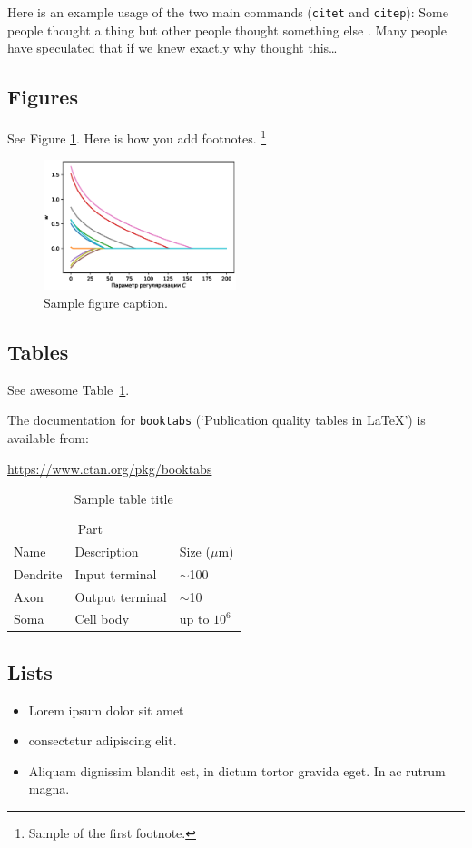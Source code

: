 \documentclass{article}
\begin{document}
Here is an example usage of the two main commands (\verb+citet+ and \verb+citep+): Some people thought a thing \citep{kour2014real, hadash2018estimate} but other people thought something else \citep{kour2014fast}. Many people have speculated that if we knew exactly why \citet{kour2014fast} thought this\dots

\subsection{Figures}
\lipsum[10]
See Figure \ref{fig:fig1}. Here is how you add footnotes. \footnote{Sample of the first footnote.}
\lipsum[11]

\begin{figure}
	\centering
	\includegraphics[width=0.5\textwidth]{../figures/log_reg_cs_exp.eps}
	\caption{Sample figure caption.}
	\label{fig:fig1}
\end{figure}

\subsection{Tables}
See awesome Table~\ref{tab:table}.

The documentation for \verb+booktabs+ (`Publication quality tables in LaTeX') is available from:
\begin{center}
	\url{https://www.ctan.org/pkg/booktabs}
\end{center}


\begin{table}
	\caption{Sample table title}
	\centering
	\begin{tabular}{lll}
		\toprule
		\multicolumn{2}{c}{Part}                   \\
		\cmidrule(r){1-2}
		Name     & Description     & Size ($\mu$m) \\
		\midrule
		Dendrite & Input terminal  & $\sim$100     \\
		Axon     & Output terminal & $\sim$10      \\
		Soma     & Cell body       & up to $10^6$  \\
		\bottomrule
	\end{tabular}
	\label{tab:table}
\end{table}

\subsection{Lists}
\begin{itemize}
	\item Lorem ipsum dolor sit amet
	\item consectetur adipiscing elit.
	\item Aliquam dignissim blandit est, in dictum tortor gravida eget. In ac rutrum magna.
\end{itemize}




\end{document}

